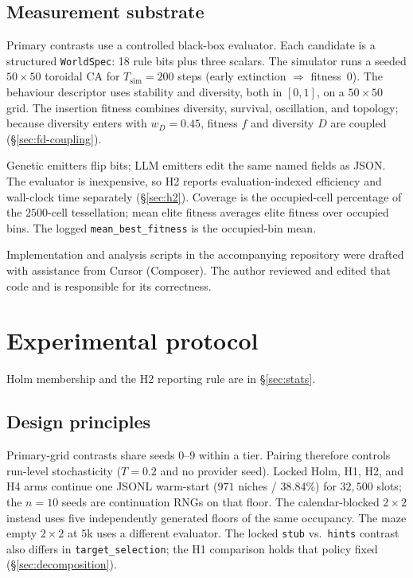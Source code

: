 \documentclass[preprint,12pt]{elsarticle}
\begin{document}
\subsection{Measurement substrate}
\label{sec:substrate}

Primary contrasts use a controlled black-box evaluator. Each candidate is a structured \texttt{WorldSpec}: 18 rule bits plus three scalars. The simulator runs a seeded $50\times50$ toroidal CA for $T_{\mathrm{sim}}{=}200$ steps (early extinction $\Rightarrow$ fitness~0). The behaviour descriptor uses stability and diversity, both in $[0,1]$, on a $50\times50$ grid. The insertion fitness combines diversity, survival, oscillation, and topology; because diversity enters with $w_D{=}0.45$, fitness $f$ and diversity $D$ are coupled (\S\ref{sec:fd-coupling}).

Genetic emitters flip bits; LLM emitters edit the same named fields as JSON. The evaluator is inexpensive, so H2 reports evaluation-indexed efficiency and wall-clock time separately (\S\ref{sec:h2}). Coverage is the occupied-cell percentage of the $2500$-cell tessellation; mean elite fitness averages elite fitness over occupied bins. The logged \texttt{mean\_best\_fitness} is the occupied-bin mean.

Implementation and analysis scripts in the accompanying repository were drafted with assistance from Cursor (Composer). The author reviewed and edited that code and is responsible for its correctness.

\section{Experimental protocol}
\label{sec:protocol}

Holm membership and the H2 reporting rule are in \S\ref{sec:stats}.

\subsection{Design principles}

Primary-grid contrasts share seeds $0$--$9$ within a tier. Pairing therefore controls run-level stochasticity ($T{=}0.2$ and no provider seed). Locked Holm, H1, H2, and H4 arms continue one JSONL warm-start ($971$ niches / $38.84\%$) for $32{,}500$ slots; the $n{=}10$ seeds are continuation RNGs on that floor. The calendar-blocked $2\times2$ instead uses five independently generated floors of the same occupancy. The maze empty $2\times2$ at $5$k uses a different evaluator. The locked \texttt{stub} vs.\ \texttt{hints} contrast also differs in \texttt{target\_selection}; the H1 comparison holds that policy fixed (\S\ref{sec:decomposition}).
\end{document}
